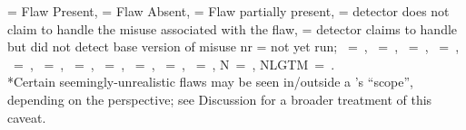 \begin{table}[t]
{\begin{tabular}{
	p{0.5cm} | c | c | c | c | c | c | c | c | c | c | c | c | c | c }
\end{tabular}}
\begin{flushleft}
{\footnotesize \no{} = Flaw Present, \ye{} = Flaw Absent, \pr{} = Flaw partially present, \na = detector does not claim to handle the misuse associated with the flaw, \np= detector claims to handle but did not detect base version of misuse nr =  not yet run; \codegurushort~=~\codeguru, \sonarqubeshort~=~\sonarqube, \snykshort~=~\snyk, \codigashort~=~\codiga, \deepsourceshort~=~\deepsource, \newcryptoguardshort~=~\cryptoguardupdate, \newcognicryptshort~=~\cognicryptupdate, \newspotbugsshort~=~\spotbugsupdate, \newcoverityshort~=~\coverityupdate, \newqarkshort~=~\qarkupdate, \newshiftleftshort~=~\shiftleftupdate, N\codeqlgcsshort~=~\codeqlversion, NLGTM~=~\newlgtm.\\
*Certain seemingly-unrealistic flaws may be seen in/outside a \detector's ``scope'', depending on the perspective; see Discussion for a broader treatment of this caveat.
}
\end{flushleft}
\end{table}